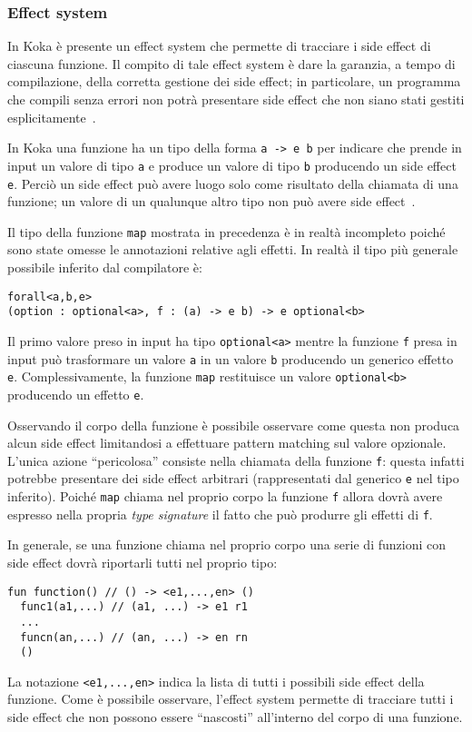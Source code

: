 \subsubsection{Effect system}
In Koka è presente un effect system che permette di tracciare i side effect di ciascuna funzione. Il compito di tale effect system è dare la garanzia, a tempo di compilazione, della corretta gestione dei side effect; in particolare, un programma che compili senza errori non potrà presentare side effect che non siano stati gestiti esplicitamente~\cite{cit:koka-programming-with-row-polymorphic-effect-types}.

In Koka una funzione ha un tipo della forma \lstinline{a -> e b} per indicare che prende in input un valore di tipo \lstinline{a} e produce un valore di tipo \lstinline{b} producendo un side effect \lstinline{e}. Perciò un side effect può avere luogo solo come risultato della chiamata di una funzione; un valore di un qualunque altro tipo non può avere side effect~\cite{cit:algebraic-effects-for-functional-programming}.

Il tipo della funzione \lstinline{map} mostrata in precedenza è in realtà incompleto poiché sono state omesse le annotazioni relative agli effetti. In realtà il tipo più generale possibile inferito dal compilatore è:
\begin{lstlisting}[language=koka]
forall<a,b,e>
(option : optional<a>, f : (a) -> e b) -> e optional<b>
\end{lstlisting}
Il primo valore preso in input ha tipo \lstinline{optional<a>} mentre la funzione \lstinline{f} presa in input può trasformare un valore \lstinline{a} in un valore \lstinline{b} producendo un generico effetto \lstinline{e}.
Complessivamente, la funzione \lstinline{map} restituisce un valore \lstinline{optional<b>} producendo un effetto \lstinline{e}.

Osservando il corpo della funzione è possibile osservare come questa non produca alcun side effect limitandosi a effettuare pattern matching sul valore opzionale.
L'unica azione ``pericolosa'' consiste nella chiamata della funzione \lstinline{f}: questa infatti potrebbe presentare dei side effect arbitrari (rappresentati dal generico \lstinline{e} nel tipo inferito). Poiché \lstinline{map} chiama nel proprio corpo la funzione \lstinline{f} allora dovrà avere espresso nella propria \emph{type signature} il fatto che può produrre gli effetti di \lstinline{f}.

In generale, se una funzione chiama nel proprio corpo una serie di funzioni con side effect dovrà riportarli tutti nel proprio tipo:
\begin{lstlisting}[language=koka]
fun function() // () -> <e1,...,en> ()
  func1(a1,...) // (a1, ...) -> e1 r1
  ... 
  funcn(an,...) // (an, ...) -> en rn 
  ()
\end{lstlisting}
La notazione \lstinline{<e1,...,en>} indica la lista di tutti i possibili side effect della funzione. Come è possibile osservare, l'effect system permette di tracciare tutti i side effect che non possono essere ``nascosti'' all'interno del corpo di una funzione.

